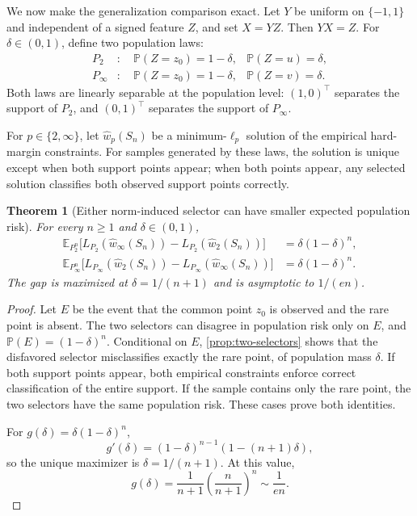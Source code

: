 \documentclass[11pt,twoside]{article}
\newcommand{\E}{\mathbb E}
\renewcommand{\P}{\mathbb P}
\newtheorem{theorem}{Theorem}[section]
\theoremstyle{definition}
\theoremstyle{remark}
\begin{document}
We now make the generalization comparison exact. Let $Y$ be uniform on
$\{-1,1\}$ and independent of a signed feature $Z$, and set $X=YZ$. Then
$YX=Z$. For $\delta\in(0,1)$, define two population laws:
\begin{align}
 P_2&:\quad \P(Z=z_0)=1-\delta,
                 &\P(Z=u)=\delta,\label{eq:p2-law}\\
 P_\infty&:\quad \P(Z=z_0)=1-\delta,
                 &\P(Z=v)=\delta.\label{eq:pinf-law}
\end{align}
Both laws are linearly separable at the population level: $(1,0)^\top$
separates the support of $P_2$, and $(0,1)^\top$ separates the support of
$P_\infty$.

For $p\in\{2,\infty\}$, let $\widehat w_p(S_n)$ be a minimum-$\ell_p$
solution of the empirical hard-margin constraints. For samples generated
by these laws, the solution is unique except when both support points appear;
when both points appear, any selected solution classifies both observed
support points correctly.

\begin{theorem}[Either norm-induced selector can have smaller expected population risk]
\label{thm:two-point-reversal}
For every $n\ge1$ and $\delta\in(0,1)$,
\begin{align*}
 \E_{P_2^n}\bigl[L_{P_2}(\widehat w_\infty(S_n))
               -L_{P_2}(\widehat w_2(S_n))\bigr]
 &=\delta(1-\delta)^n,\\
 \E_{P_\infty^n}\bigl[L_{P_\infty}(\widehat w_2(S_n))
               -L_{P_\infty}(\widehat w_\infty(S_n))\bigr]
 &=\delta(1-\delta)^n.
\end{align*}
The gap is maximized at $\delta=1/(n+1)$ and is asymptotic to $1/(en)$.
\end{theorem}

\begin{proof}
Let $E$ be the event that the common point $z_0$ is observed and the rare
point is absent. The two selectors can disagree in population risk only on
$E$, and $\P(E)=(1-\delta)^n$. Conditional on $E$,
\cref{prop:two-selectors} shows that the
disfavored selector misclassifies exactly the rare point, of population mass
$\delta$. If both support points appear, both empirical constraints enforce
correct classification of the entire support. If the sample contains only
the rare point, the two selectors have the same population risk. These cases prove
both identities.

For $g(\delta)=\delta(1-\delta)^n$,
\[
 g'(\delta)=(1-\delta)^{n-1}(1-(n+1)\delta),
\]
so the unique maximizer is $\delta=1/(n+1)$. At this value,
\[
 g(\delta)=\frac1{n+1}\left(\frac n{n+1}\right)^n
 \sim\frac1{en}.
\]
\end{proof}
\end{document}
